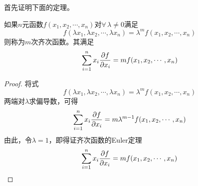 首先证明下面的定理。
\begin{theorem}[齐次函数的Euler定理]
\label{齐次函数的Euler定理}
如果$n$元函数$f(x_1,x_2,\cdots,x_n)$对$\forall \, \lambda \neq 0$满足
\begin{equation*}
	f(\lambda x_1,\lambda x_2,\cdots,\lambda x_n) = \lambda^m f(x_1,x_2,\cdots,x_n)
\end{equation*}
则称为$m$次{\heiti 齐次函数}。其满足
\begin{equation}
	\sum_{i=1}^n x_i \frac{\partial f}{\partial x_i} = mf(x_1,x_2,\cdots,x_n)
\end{equation}
\end{theorem}
\begin{proof}
将式
\begin{equation*}
	f(\lambda x_1,\lambda x_2,\cdots,\lambda x_n) = \lambda^m f(x_1,x_2,\cdots,x_n)
\end{equation*}
两端对$\lambda$求偏导数，可得
\begin{equation*}
	\sum_{i=1}^n x_i \frac{\partial f}{\partial x_i} = m\lambda^{m-1} f(x_1,x_2,\cdots,x_n)
\end{equation*}
由此，令$\lambda = 1$，即得证齐次函数的Euler定理
\begin{equation*}
	\sum_{i=1}^n x_i \frac{\partial f}{\partial x_i} = mf(x_1,x_2,\cdots,x_n) \qedhere
\end{equation*}
\end{proof}


